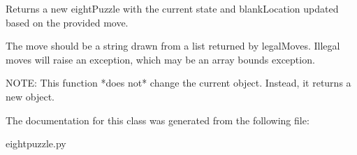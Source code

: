 \begin{DoxyVerb}  Returns a new eightPuzzle with the current state and blankLocation
updated based on the provided move.

The move should be a string drawn from a list returned by legalMoves.
Illegal moves will raise an exception, which may be an array bounds
exception.

NOTE: This function *does not* change the current object.  Instead,
it returns a new object.
\end{DoxyVerb}
 

The documentation for this class was generated from the following file\+:\begin{DoxyCompactItemize}
\item 
eightpuzzle.\+py\end{DoxyCompactItemize}
